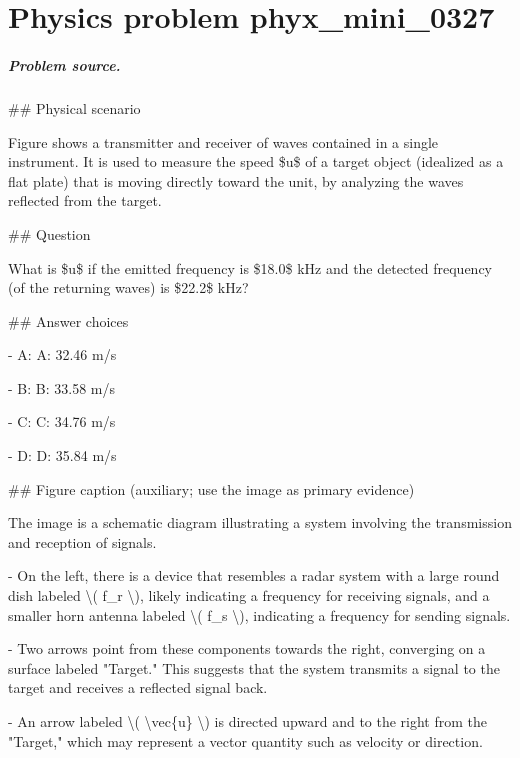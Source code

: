 
\chapter{Physics problem phyx\_mini\_0327}
\label{ch:PhyXMiniProblems_problem_phyx_mini_0327}

\paragraph{Problem source.}
\#\# Physical scenario

Figure shows a transmitter and receiver of waves contained in a single instrument. It is used to measure the speed \$u\$ of a target object (idealized as a flat plate) that is moving directly toward the unit, by analyzing the waves reflected from the target.

\#\# Question

What is \$u\$ if the emitted frequency is \$18.0\$ kHz and the detected frequency (of the returning waves) is \$22.2\$ kHz?

\#\# Answer choices

- A: A: 32.46 m/s

- B: B: 33.58 m/s

- C: C: 34.76 m/s

- D: D: 35.84 m/s

\#\# Figure caption (auxiliary; use the image as primary evidence)

The image is a schematic diagram illustrating a system involving the transmission and reception of signals. 

- On the left, there is a device that resembles a radar system with a large round dish labeled \textbackslash{}( f\_r \textbackslash{}), likely indicating a frequency for receiving signals, and a smaller horn antenna labeled \textbackslash{}( f\_s \textbackslash{}), indicating a frequency for sending signals.
  
- Two arrows point from these components towards the right, converging on a surface labeled "Target." This suggests that the system transmits a signal to the target and receives a reflected signal back.

- An arrow labeled \textbackslash{}( \textbackslash{}vec\{u\} \textbackslash{}) is directed upward and to the right from the "Target," which may represent a vector quantity such as velocity or direction.


